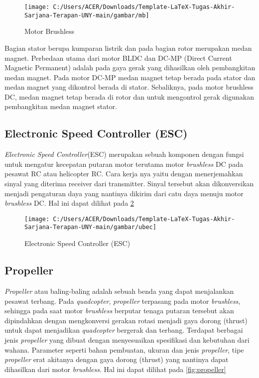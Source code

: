 \begin{figure}[H]
	\centering
	\texttt{[image: C:/Users/ACER/Downloads/Template-LaTeX-Tugas-Akhir-Sarjana-Terapan-UNY-main/gambar/mb]}
	\caption{Motor Brushless}
	\label{fig:mb}
\end{figure}


Bagian stator berupa kumparan listrik dan pada bagian rotor merupakan medan magnet. Perbedaan utama dari motor BLDC dan DC-MP (Direct Current Magnetic Permanent) adalah pada gaya gerak yang dihasilkan oleh pembangkitan medan magnet. Pada motor DC-MP medan magnet tetap berada pada stator dan medan magnet yang dikontrol berada di stator. Sebaliknya, pada motor brushless DC, medan magnet tetap berada di rotor dan untuk mengontrol gerak digunakan pembangkitan medan magnet stator.

\subsection{Electronic Speed Controller (ESC)}
\textit{Electronic Speed Controller}(ESC) merupakan sebuah komponen dengan fungsi untuk mengatur kecepatan putaran motor terutama motor \textit{brushless} DC pada pesawat RC atau helicopter RC\cite{pranita2023kontrol}. Cara kerja nya yaitu dengan menerjemahkan sinyal yang diterima receiver dari transmitter. Sinyal tersebut akan dikonversikan menjadi pengaturan daya yang nantinya dikirim dari catu daya menuju motor \textit{brushless} DC. Hal ini dapat dilihat pada \cref{fig:ubec}

\begin{figure}[H]
	\centering
	\texttt{[image: C:/Users/ACER/Downloads/Template-LaTeX-Tugas-Akhir-Sarjana-Terapan-UNY-main/gambar/ubec]}
	\caption{Electronic Speed Controller (ESC)}
	\label{fig:ubec}
\end{figure}

\subsection{Propeller}
\textit{Propeller} atau baling-baling adalah sebuah benda yang dapat menjalankan  pesawat terbang\cite{aziz2021studi}. Pada \textit{quadcopter}, \textit{propeller} terpasang pada motor \textit{brushless}, sehingga pada saat motor \textit{brushless} berputar tenaga putaran tersebut akan dipindahkan dengan mengkonversi gerakan rotasi menjadi gaya dorong (thrust) untuk dapat menjadikan \textit{quadcopter} bergerak dan terbang. Terdapat berbagai jenis \textit{propeller} yang dibuat dengan menyesuaikan spesifikasi dan kebutuhan dari wahana. Parameter seperti bahan pembuatan, ukuran dan jenis \textit{propeller}, tipe \textit{propeller} erat akitanya dengan gaya dorong (thrust) yang nantinya dapat dihasilkan dari motor \textit{brushless}. Hal ini dapat dilihat pada \cref{fig:propeller}

